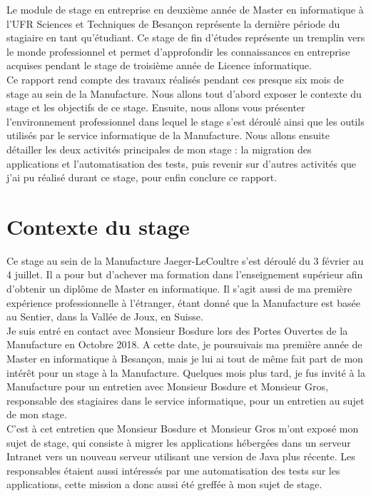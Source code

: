 Le module de stage en entreprise en deuxième année de Master en informatique à l'UFR Sciences et Techniques de Besançon représente la dernière période du stagiaire en tant qu'étudiant. Ce stage de fin d'études représente un tremplin vers le monde professionnel et permet d'approfondir les connaissances en entreprise acquises pendant le stage de troisième année de Licence informatique. \\

Ce rapport rend compte des travaux réalisés pendant ces presque six mois de stage au sein de la Manufacture. Nous allons tout d'abord exposer le contexte du stage et les objectifs de ce stage. Ensuite, nous allons vous présenter l'environnement professionnel dans lequel le stage s'est déroulé ainsi que les outils utilisés par le service informatique de la Manufacture. Nous allons ensuite détailler les deux activités principales de mon stage : la migration des applications et l'automatisation des tests, puis revenir sur d'autres activités que j'ai pu réalisé durant ce stage, pour enfin conclure ce rapport.

\section{Contexte du stage}

Ce stage au sein de la Manufacture Jaeger-LeCoultre s'est déroulé du 3 février au 4 juillet. Il a pour but d'achever ma formation dans l'enseignement supérieur afin d'obtenir un diplôme de Master en informatique. Il s'agit aussi de ma première expérience professionnelle à l'étranger, étant donné que la Manufacture est basée au Sentier, dans la Vallée de Joux, en Suisse. \\

Je suis entré en contact avec Monsieur Bosdure lors des Portes Ouvertes de la Manufacture en Octobre 2018. A cette date, je poursuivais ma première année de Master en informatique à Besançon, mais je lui ai tout de même fait part de mon intérêt pour un stage à la Manufacture. Quelques mois plus tard, je fus invité à la Manufacture pour un entretien avec Monsieur Bosdure et Monsieur Gros, responsable des stagiaires dans le service informatique, pour un entretien au sujet de mon stage. \\

C'est à cet entretien que Monsieur Bosdure et Monsieur Gros m'ont exposé mon sujet de stage, qui consiste à migrer les applications hébergées dans un serveur Intranet vers un nouveau serveur utilisant une version de Java plus récente. Les responsables étaient aussi intéressés par une automatisation des tests sur les applications, cette mission a donc aussi été greffée à mon sujet de stage. 

